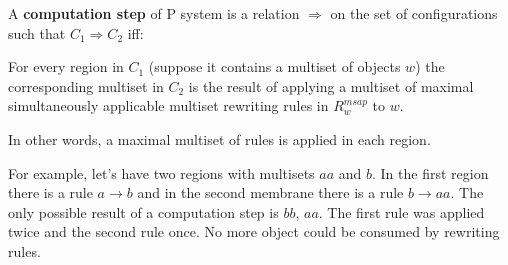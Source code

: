 A {\bf computation step} of P system is a relation $\Rightarrow$ on the set of configurations such that $C_1 \Rightarrow C_2$ iff:

For every region in $C_1$ (suppose it contains a multiset of objects $w$) the corresponding multiset in $C_2$ is the result of applying a multiset of maximal simultaneously applicable multiset rewriting rules in $R^{msap}_w$ to $w$.

In other words, a maximal multiset of rules is applied in each region.

For example, let's have two regions with multisets $aa$ and $b$. In the first region there is a rule $a\rightarrow b$ and in the second membrane there is a rule $b\rightarrow aa$. The only possible result of a computation step is $bb$, $aa$. The first rule was applied twice and the second rule once. No more object could be consumed by rewriting rules.